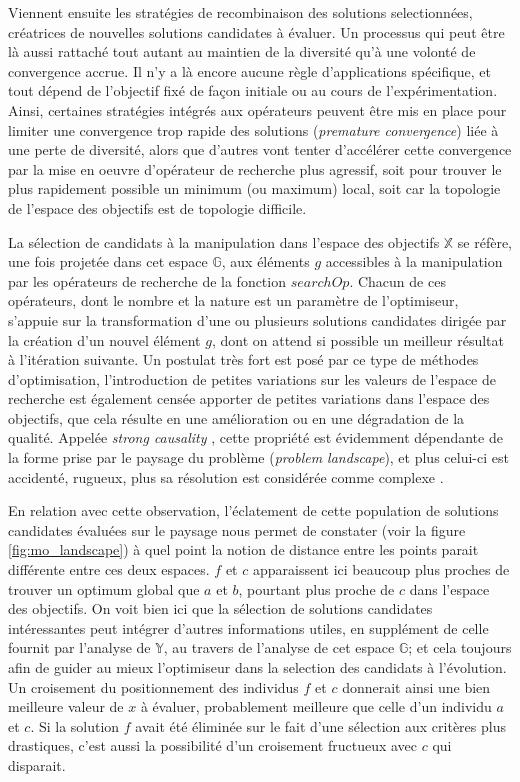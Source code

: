 Viennent ensuite les stratégies de recombinaison des solutions selectionnées, créatrices de nouvelles solutions candidates à évaluer. Un processus qui peut être là aussi rattaché tout autant au maintien de la diversité qu'à une volonté de convergence accrue. Il n'y a là encore aucune règle d'applications spécifique, et tout dépend de l'objectif fixé de façon initiale ou au cours de l'expérimentation. Ainsi, certaines stratégies intégrés aux opérateurs peuvent être mis en place pour limiter une convergence trop rapide des solutions (\textit{premature convergence}) liée à une perte de diversité, alors que d'autres vont tenter d'accélérer cette convergence par la mise en oeuvre d'opérateur de recherche plus agressif, soit pour trouver le plus rapidement possible un minimum (ou maximum) local, soit car la topologie de l'espace des objectifs est de topologie difficile.

La sélection de candidats à la manipulation dans l'espace des objectifs $\mathbb{X}$ se réfère, une fois projetée dans cet espace $\mathbb{G}$, aux éléments $g$ accessibles à la manipulation par les opérateurs de recherche de la fonction $searchOp$. Chacun de ces opérateurs, dont le nombre et la nature est un paramètre de l'optimiseur, s'appuie sur la transformation d'une ou plusieurs solutions candidates dirigée par la création d'un nouvel élément $g$, dont on attend si possible un meilleur résultat à l'itération suivante. Un postulat très fort est posé par ce type de méthodes d'optimisation, l'introduction de petites variations sur les valeurs de l'espace de recherche est également censée apporter de petites variations dans l'espace des objectifs, que cela résulte en une amélioration ou en une dégradation de la qualité. Appelée \textit{strong causality} , cette propriété est évidemment dépendante de la forme prise par le paysage du problème (\textit{problem landscape}), et plus celui-ci est accidenté, rugueux, plus sa résolution est considérée comme complexe .

En relation avec cette observation, l'éclatement de cette population de solutions candidates évaluées sur le paysage nous permet de constater (voir la figure \ref{fig:mo_landscape}) à quel point la notion de distance entre les points parait différente entre ces deux espaces. $f$ et $c$ apparaissent ici beaucoup plus proches de trouver un optimum global que $a$ et $b$, pourtant plus proche de $c$ dans l'espace des objectifs. On voit bien ici que la sélection de solutions candidates intéressantes peut intégrer d'autres informations utiles, en supplément de celle fournit par l'analyse de $\mathbb{Y}$, au travers de l'analyse de cet espace $\mathbb{G}$; et cela toujours afin de guider au mieux l'optimiseur dans la selection des candidats à l'évolution. Un croisement du positionnement des individus $f$ et $c$ donnerait ainsi une bien meilleure valeur de $x$ à évaluer, probablement meilleure que celle d'un individu $a$ et $c$. Si la solution $f$ avait été éliminée sur le fait d'une sélection aux critères plus drastiques, c'est aussi la possibilité d'un croisement fructueux avec $c$ qui disparait.

